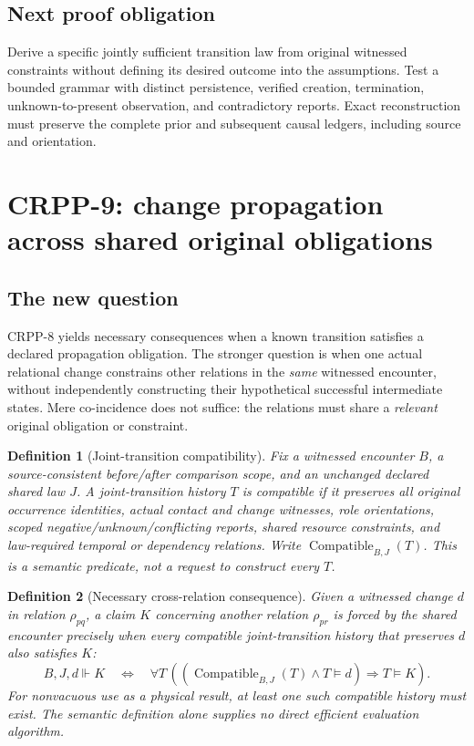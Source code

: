 \documentclass[11pt]{article}
\newtheorem{definition}{Definition}[section]
\begin{document}
\subsection{Next proof obligation}
Derive a specific jointly sufficient transition law
from original witnessed constraints without defining
its desired outcome into the assumptions. Test a
bounded grammar with distinct persistence, verified
creation, termination, unknown-to-present observation,
and contradictory reports. Exact reconstruction
must preserve the complete prior and subsequent
causal ledgers, including source and orientation.


\section{CRPP-9: change propagation across shared original obligations}
\label{sec:crpp9}
\subsection{The new question}
CRPP-8 yields necessary consequences when a known transition
satisfies a declared propagation obligation. The stronger
question is when one actual relational change constrains
other relations in the \emph{same} witnessed encounter,
without independently constructing their hypothetical
successful intermediate states. Mere co-incidence does
not suffice: the relations must share a \emph{relevant}
original obligation or constraint.

\begin{definition}[Joint-transition compatibility]
Fix a witnessed encounter $B$, a source-consistent before/after
comparison scope, and an unchanged declared shared law $J$.
A joint-transition history $T$ is compatible if it preserves
all original occurrence identities, actual contact and change
witnesses, role orientations, scoped negative/unknown/conflicting
reports, shared resource constraints, and law-required temporal
or dependency relations. Write $\operatorname{Compatible}_{B,J}(T)$.
This is a semantic predicate, not a request to construct every $T$.
\end{definition}

\begin{definition}[Necessary cross-relation consequence]
Given a witnessed change $d$ in relation $\rho_{pq}$, a
claim $K$ concerning another relation $\rho_{pr}$ is
\emph{forced} by the shared encounter precisely when
every compatible joint-transition history that preserves
$d$ also satisfies $K$:
\[
 B,J,d\Vdash K \quad\Longleftrightarrow\quad
 \forall T\,
 ((\operatorname{Compatible}_{B,J}(T)\land T\models d)
       \Rightarrow T\models K).
\]
For nonvacuous use as a physical result, at least one
such compatible history must exist. The semantic definition
alone supplies no direct efficient evaluation algorithm.
\end{definition}
\end{document}
